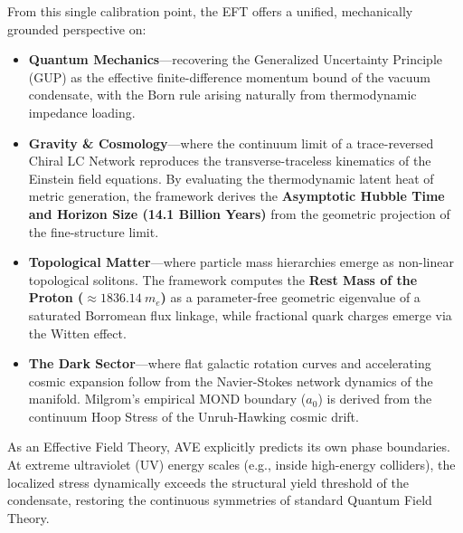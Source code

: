 From this single calibration point, the EFT offers a unified, mechanically grounded perspective on:
\begin{itemize}
    \item \textbf{Quantum Mechanics}---recovering the Generalized Uncertainty Principle (GUP) as the effective finite-difference momentum bound of the vacuum condensate, with the Born rule arising naturally from thermodynamic impedance loading.
    \item \textbf{Gravity \& Cosmology}---where the continuum limit of a trace-reversed Chiral LC Network reproduces the transverse-traceless kinematics of the Einstein field equations. By evaluating the thermodynamic latent heat of metric generation, the framework derives the \textbf{Asymptotic Hubble Time and Horizon Size (14.1 Billion Years)} from the geometric projection of the fine-structure limit.
    \item \textbf{Topological Matter}---where particle mass hierarchies emerge as non-linear topological solitons. The framework computes the \textbf{Rest Mass of the Proton ($\approx 1836.14\ m_e$)} as a parameter-free geometric eigenvalue of a saturated Borromean flux linkage, while fractional quark charges emerge via the Witten effect.
    \item \textbf{The Dark Sector}---where flat galactic rotation curves and accelerating cosmic expansion follow from the Navier-Stokes network dynamics of the manifold. Milgrom's empirical MOND boundary ($a_0$) is derived from the continuum Hoop Stress of the Unruh-Hawking cosmic drift.
\end{itemize}

As an Effective Field Theory, AVE explicitly predicts its own phase boundaries. At extreme ultraviolet (UV) energy scales (e.g., inside high-energy colliders), the localized stress dynamically exceeds the structural yield threshold of the condensate, restoring the continuous symmetries of standard Quantum Field Theory.

